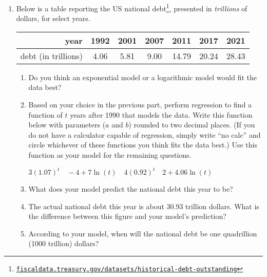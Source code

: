 \begin{enumerate}

    \item 
        Below is a table reporting 
        the US national debt\footnote{\href{https://fiscaldata.treasury.gov/datasets/historical-debt-outstanding/historical-debt-outstanding}{\texttt{fiscaldata.treasury.gov/datasets/historical-debt-outstanding}}},
        presented in \emph{trillions} of dollars, for select years.
        \par\begin{center}\begin{tabular}{r||c|c|c|c|c|c}
            year                & 1992 & 2001 & 2007 & 2011 & 2017 & 2021 \\\hline
            debt (in trillions) & 4.06 & 5.81 & 9.00 & 14.79 & 20.24 & 28.43 
        \end{tabular}\end{center}
        \begin{enumerate}
            \item
                Do you think an exponential model 
                or a logarithmic model would fit the data best?
                \vfill\null
            \item
                Based on your choice in the previous part, 
                perform regression to find a function 
                of \(t\) years after 1990 that models the data.
                Write this function below with parameters (\(a\) and \(b\))
                rounded to two decimal places.
                (If you do not have a calculator capable of regression,
                simply write ``no calc''
                and circle whichever of these functions you think 
                fits the data best.)
                Use this function as your model 
                for the remaining questions.
                \par\(\displaystyle 3(1.07)^t \quad -4+7\ln\left(t\right) \quad 4(0.92)^t \quad 2+4.06\ln\left(t\right)\)
            \item
                What does your model predict 
                the national debt this year to be?
                \vfill\null
                \vfill\null
            \item
                The actual national debt this year is
                about 30.93 trillion dollars.
                What is the difference between this figure 
                and your model's prediction?
                \vfill\null
                \vfill\null
            \item
                According to your model, 
                when will the national debt be
                one quadrillion (1000 trillion) dollars?
                \vfill\null
                \vfill\null
                \vfill\null
                \vfill\null
        \end{enumerate}


\end{enumerate}
